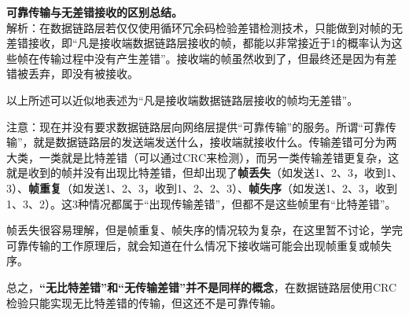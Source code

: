 \textbf{{可靠传输与无差错接收的区别总结。}}\\

解析：在数据链路层若仅仅使用循环冗余码检验差错检测技术，只能做到对帧的无差错接收，即``凡是接收端数据链路层接收的帧，都能以非常接近于1的概率认为这些帧在传输过程中没有产生差错''。接收端的帧虽然收到了，但最终还是因为有差错被丢弃，即没有被接收。

以上所述可以近似地表述为``凡是接收端数据链路层接收的帧均无差错''。

{注意：现在并没有要求数据链路层向网络层提供``可靠传输''的服务。}所谓``可靠传输''，就是数据链路层的发送端发送什么，接收端就接收什么。传输差错可分为两大类，一类就是比特差错（可以通过CRC来检测），而另一类传输差错更复杂，这就是收到的帧并没有出现比特差错，但却出现了\textbf{帧丢失}（如发送1、2、3，收到1、3）、\textbf{帧重复}（如发送1、2、3，收到1、2、2、3）、\textbf{帧失序}（如发送1、2、3，收到1、3、2）。这3种情况都属于``出现传输差错''，但都不是这些帧里有``比特差错''。

帧丢失很容易理解，但是帧重复、帧失序的情况较为复杂，在这里暂不讨论，学完可靠传输的工作原理后，就会知道在什么情况下接收端可能会出现帧重复或帧失序。

总之，\textbf{``无比特差错''和``无传输差错''并不是同样的概念}，在数据链路层使用CRC检验只能实现无比特差错的传输，但这还不是可靠传输。
